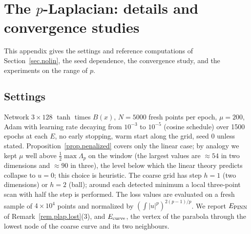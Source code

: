 \documentclass[10pt]{amsart}
\theoremstyle{definition}
\theoremstyle{remark}
\theoremstyle{plain}
\begin{document}
\section{The \texorpdfstring{$p$}{p}-Laplacian: details and convergence studies}\label{app.plap}
This appendix gives the settings and reference computations of Section~\ref{sec.nolin}, the seed dependence, the convergence study, and the experiments on the range of $p$.

\subsection{Settings}
Network $3\times128$ $\tanh$ times $B(x)$, $N=5000$ fresh points per epoch, $\mu=200$, Adam with learning
rate decaying from $10^{-3}$ to $10^{-5}$ (cosine schedule) over 1500 epochs at each $E$, no early
stopping, warm start along the grid, seed 0 unless stated. Proposition~\ref{prop.penalized} covers only
the linear case; by analogy we kept $\mu$ well above $\frac12\max\Lambda_p$ on the window (the largest
values are $\approx54$ in two dimensions and $\approx90$ in three), the level below which the linear theory
predicts collapse to $u=0$; this choice is heuristic. The coarse grid has step $h=1$ (two dimensions) or
$h=2$ (ball); around each detected minimum a local three-point scan with half the step is performed. The
loss values are evaluated on a fresh sample of $4\times10^4$ points and normalized by
$(\int|u|^p)^{2(p-1)/p}$. We report $E_{\rm PINN}$ of Remark~\ref{rem.plap.lost}(3), and $E_{\rm curve}$,
the vertex of the parabola through the lowest node of the coarse curve and its two neighbours.
\end{document}
